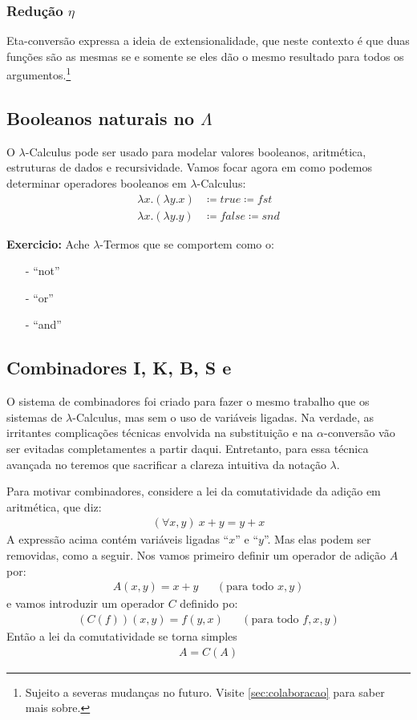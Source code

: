 \documentclass[12pt, a4paper]{article}
\begin{document}
\subsubsection{Redução $\eta$}
Eta-conversão expressa a ideia de extensionalidade, que neste contexto é que duas funções são as mesmas se e somente se eles dão o mesmo resultado para todos os argumentos.\footnote{Sujeito a severas mudanças no futuro. Visite \ref{sec:colaboracao} para saber mais sobre.}

\subsection{Booleanos naturais no $\Lambda$}
O $\lambda$-Calculus pode ser usado para modelar valores booleanos, aritmética, estruturas de dados e recursividade. Vamos focar agora em como podemos determinar operadores booleanos em $\lambda$-Calculus:
\begin{align*}
\lambda x.(\lambda y.x) &\coloneqq true \coloneqq fst\\
\lambda x.(\lambda y.y) &\coloneqq false \coloneqq snd
\end{align*}

\textbf{Exercicio:}  Ache $\lambda$-Termos que se comportem como o: 
\begin{itemize}
\item[-] ``not''
\item[-] ``or''
\item[-] ``and''
\end{itemize}

\subsection{Combinadores I, K, B, S \cite{book:111321} e \cite{stenlund2012combinators}}
O sistema de combinadores foi criado para fazer o mesmo trabalho que os sistemas de $\lambda$-Calculus, mas sem o uso de variáveis ligadas. Na verdade, as irritantes complicações técnicas envolvida na substituição e na $\alpha$-conversão vão ser evitadas completamentes a partir daqui. Entretanto, para essa técnica avançada no teremos que sacrificar a clareza intuitiva da notação $\lambda$.

Para motivar combinadores, considere a lei da comutatividade da adição em aritmética, que diz:
\begin{align*}
(\forall x,y)~x+y = y + x
\end{align*}  
A expressão acima contém variáveis ligadas ``$x$'' e ``$y$''. Mas elas podem ser removidas, como a seguir. Nos vamos primeiro definir um operador de adição $A$ por:
\begin{align*}
A(x,y) = x + y && (\text{para todo } x,y)
\end{align*}
e vamos introduzir um operador $C$ definido po:
\begin{align*}
(C(f))(x,y) = f(y,x) && (\text{para todo } f,x,y)
\end{align*}
Então a lei da comutatividade se torna simples
\begin{align*}
A = C(A)
\end{align*}
\end{document}
